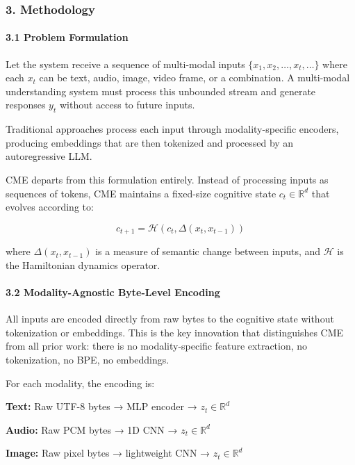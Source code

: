 \documentclass[
  11pt,
  a4paper,
]{article}
\begin{document}
\subsubsection{3. Methodology}\label{methodology}

\paragraph{3.1 Problem Formulation}\label{problem-formulation}

Let the system receive a sequence of multi-modal inputs
\(\{x_1, x_2, \dots, x_t, \dots\}\) where each \(x_t\) can be text,
audio, image, video frame, or a combination. A multi-modal understanding
system must process this unbounded stream and generate responses \(y_t\)
without access to future inputs.

Traditional approaches process each input through modality-specific
encoders, producing embeddings that are then tokenized and processed by
an autoregressive LLM.

CME departs from this formulation entirely. Instead of processing inputs
as sequences of tokens, CME maintains a fixed-size cognitive state
\(c_t \in \mathbb{R}^{d}\) that evolves according to:

\[
c_{t+1} = \mathcal{H}\left(c_t, \Delta(x_t, x_{t-1})\right)
\]

where \(\Delta(x_t, x_{t-1})\) is a measure of semantic change between
inputs, and \(\mathcal{H}\) is the Hamiltonian dynamics operator.

\paragraph{3.2 Modality-Agnostic Byte-Level
Encoding}\label{modality-agnostic-byte-level-encoding}

All inputs are encoded directly from raw bytes to the cognitive state
without tokenization or embeddings. This is the key innovation that
distinguishes CME from all prior work: there is no modality-specific
feature extraction, no tokenization, no BPE, no embeddings.

For each modality, the encoding is:

\textbf{Text:} Raw UTF-8 bytes → MLP encoder →
\(z_t \in \mathbb{R}^{d}\)

\textbf{Audio:} Raw PCM bytes → 1D CNN → \(z_t \in \mathbb{R}^{d}\)

\textbf{Image:} Raw pixel bytes → lightweight CNN →
\(z_t \in \mathbb{R}^{d}\)
\end{document}
